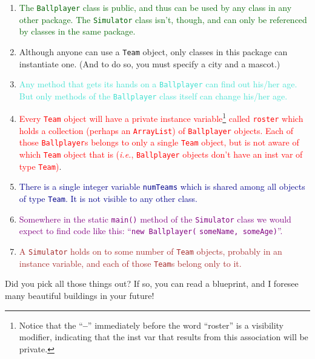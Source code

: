 \begin{enumerate}
\itemsep.1em

\item \textcolor{darkgreen}{The \texttt{Ballplayer} class is public, and thus
can be used by any class in any other package. The \texttt{Simulator} class
isn't, though, and can only be referenced by classes in the same package.}

\item \textcolor{BurntOrange}{Although anyone can use a \texttt{Team} object,
only classes in this package can instantiate one. (And to do so, you must
specify a city and a mascot.)} 

\item \textcolor{Turquoise}{Any method that gets its hands on a
\texttt{Ballplayer} can find out his/her age. But only methods of the
\texttt{Ballplayer} class itself can change his/her age.}

\pagebreak
\item \textcolor{Red}{Every \texttt{Team} object will have a private instance
variable\footnote{Notice that the ``\textbf{--}'' immediately before the word
``roster'' is a visibility modifier, indicating that the inst var that results
from this association will be private.} called \texttt{roster} which holds a collection (perhaps an
\texttt{ArrayList}) of \texttt{Ballplayer} objects. Each of those
\texttt{Ballplayer}s belongs to only a single \texttt{Team} object, but is not
aware of which \texttt{Team} object that is (\textit{i.e.},
\texttt{Ballplayer} objects don't have an inst var of type \texttt{Team})}.

\item \textcolor{darkblue}{There is a single integer variable \texttt{numTeams}
which is shared among all objects of type \texttt{Team}. It is not visible to
any other class.}

\item \textcolor{Purple}{Somewhere in the static \texttt{main()} method of the
\texttt{Simulator} class we would expect to find code like this:
``\texttt{new Ballplayer(} \texttt{someName, someAge)}''.}

\item \textcolor{Brown}{A \texttt{Simulator} holds on to some number of
\texttt{Team} objects, probably in an instance variable, and each of those
\texttt{Team}s belong only to it.}

\end{enumerate}

Did you pick all those things out? If so, you can read a blueprint, and I
foresee many beautiful buildings in your future!
